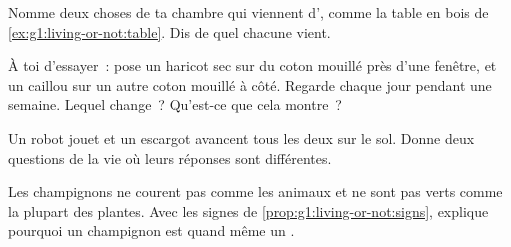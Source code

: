 \begin{exercise}[$\star$]\label{exo:g1:living-or-not:7}
Nomme deux choses de ta chambre qui viennent d', comme
la table en bois de \cref{ex:g1:living-or-not:table}. Dis de quel
 chacune vient.
\end{exercise}

\begin{exercise}[$\star$]\label{exo:g1:living-or-not:8}
À toi d'essayer~: pose un haricot sec sur du coton mouillé près
d'une fenêtre, et un caillou sur un autre coton mouillé à côté.
Regarde chaque jour pendant une semaine. Lequel change~? Qu'est-ce
que cela montre~?
\end{exercise}

\begin{exercise}[$\star\star$]\label{exo:g1:living-or-not:9}
Un robot jouet et un escargot avancent tous les deux sur le sol.
Donne deux questions de la vie où leurs réponses sont différentes.
\end{exercise}

\begin{exercise}[$\star\star$]\label{exo:g1:living-or-not:10}
Les champignons ne courent pas comme les animaux et ne sont pas
verts comme la plupart des plantes. Avec les signes de
\cref{prop:g1:living-or-not:signs}, explique pourquoi un champignon
est quand même un .
\end{exercise}
